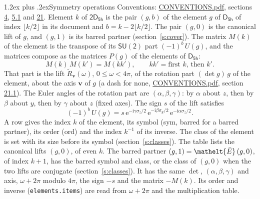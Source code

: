 \documentclass[10pt,a4paper]{article}
\makeatletter
\renewcommand\section{\@startsection{section}{1}{\z@}{-3ex plus -1ex minus -.2ex}%
  {1.2ex plus .2ex}{\normalfont\large\sffamily\bfseries\color{parttitle}}}
\numberwithin{equation}{section}
\newcommand{\eltfont}[1]{{\let\sigma\eltsigma\mathelt{#1}}}
\newcommand{\grp}[1]{\mathsf{#1}}
\newcommand{\elt}[1]{\eltfont{#1}}
\newcommand{\vv}{\mathbf{v}}
\newcommand{\iunit}{\mathrm{i}}
\newcommand{\expe}{\mathrm{e}}
\newcommand{\barred}[1]{\bar{#1}}
\newcommand{\lift}[1]{\tilde{#1}}
\newcommand{\pauli}[1]{\sigma_{#1}}
\makeatother
\begin{document}
\section{Symmetry operations}\label{s:elements}
Conventions: \href{../../CONVENTIONS.pdf}{CONVENTIONS.pdf}, sections \href{../../../rotation/CONVENTIONS.pdf\#conv.4}{4}, \href{../../../rotation/CONVENTIONS.pdf\#conv.5.1}{5.1} and \href{../../CONVENTIONS.pdf\#conv.21}{21}.
\leavevmode\label{n:index.element}\label{n:element.g}Element $k$ of $\grp{2D_{5h}}$ is the pair $(g, b)$ of the element $g$ of \href{../../../rotation/data/pdf/D5h.pdf}{$\grp{D_{5h}}$} of index $\lfloor k/2\rfloor$ in its document and $b = k - 2\lfloor k/2\rfloor$. The pair $(g, 0)$ is the canonical lift of $g$, and $(g, 1)$ is its barred partner (section~\ref{s:cover}). \label{n:matrix.element.pin}\label{n:matrix.element}The matrix $M(k)$ of the element is the transpose of its $\grp{SU(2)}$ part $(-1)^{b}\,U(g)$, and the matrices compose as the matrices $P(g)$ of the elements of $\grp{D_{5h}}$:
\begin{equation}\label{e:mprod}M(k)\,M(k') = M(kk'),\qquad kk' = \text{first } k\text{, then } k'.\end{equation}
\leavevmode\label{n:angle.omega}\label{n:vector.axis}\label{n:vector.pole}That part is the lift $\lift{R}_{\vv}(\omega)$, $0 \le \omega < 4\pi$, of the rotation part $(\det g)\,g$ of the element, about the axis $\vv$ of $g$ (a dash for none, \href{../../CONVENTIONS.pdf}{CONVENTIONS.pdf}, section \href{../../CONVENTIONS.pdf\#conv.21.1}{21.1}). \label{n:angle.euler.alpha}\label{n:angle.euler.beta}\label{n:angle.euler.gamma}\label{n:vector.coordinates}The Euler angles of the rotation part are $(\alpha,\beta,\gamma)$: by $\alpha$ about $z$, then by $\beta$ about $y$, then by $\gamma$ about $z$ (fixed axes). \label{n:local.euler.sign}The sign $s$ of the lift satisfies
\begin{equation}\label{e:euler}(-1)^{b}\,U(g) = s\,\expe^{-\iunit\gamma\pauli{z}/2}\,\expe^{-\iunit\beta\pauli{y}/2}\,\expe^{-\iunit\alpha\pauli{z}/2}.\end{equation}
\leavevmode\label{n:index.element.inverse}\label{n:head.sym}\label{n:head.ord}A row gives the index $k$ of the element, its symbol (sym, barred for a barred partner), its order (ord) and the index $k^{-1}$ of its inverse. \label{n:head.class}The class of the element is set with its size before its symbol (section~\ref{s:classes}).
The table lists the canonical lifts $(g, 0)$, of even $k$. The barred partner $(g, 1) = \elt{\barred{E}}\,(g, 0)$, of index $k + 1$, has the barred symbol and class, or the class of $(g, 0)$ when the two lifts are conjugate (section~\ref{s:classes}). It has the same $\det$, $(\alpha,\beta,\gamma)$ and axis, $\omega + 2\pi$ modulo $4\pi$, the sign $-s$ and the matrix $-M(k)$. Its order and inverse (\texttt{elements.items}) are read from $\omega + 2\pi$ and the multiplication table.
\end{document}
